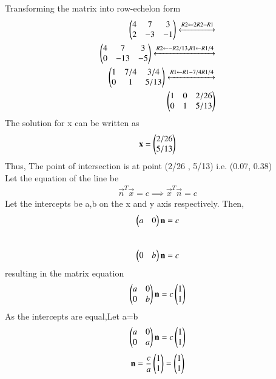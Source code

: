 \documentclass[journal,12pt,twocolumn]{IEEEtran}
\begin{document}
\begin{flushleft}
    Transforming the matrix into row-echelon form \\
    \begin{align}
    \begin{pmatrix}
    4 & 7 & 3 \\
    2 & -3 & -1
    \end{pmatrix}
      \xleftrightarrow[]{R2 \leftarrow 2R2 - R1 } \nonumber \\
    \begin{pmatrix}
    4 & 7 & 3 \\
    0 & -13 & -5
    \end{pmatrix}
    \xleftrightarrow[]{R2 \leftarrow -R2/13,R1 \leftarrow R1/4} \nonumber \\
    \begin{pmatrix}
    1 & 7/4 & 3/4 \\
    0 & 1 & 5/13
    \end{pmatrix}
    \xleftrightarrow[]{R1 \leftarrow R1-7/4R1/4} \nonumber \\
    \begin{pmatrix}
    1 & 0 & 2/26 \\
    0 & 1 & 5/13
    \end{pmatrix}
    \end{align}
    The solution for x can be written as 
    \begin{align}
    \label{expk}
    \mathbf{x} = \begin{pmatrix}2/26 \\ 5/13\end{pmatrix}
    \end{align}
    Thus, The point of intersection is at point (2/26 , 5/13) i.e. (0.07, 0.38)\\
    Let the equation of the line be
    \begin{align}
    \label{equ}
    \vec{n}^T\vec{x} = c \implies \vec{x}^T\vec{n} = c
    \end{align}
    Let the intercepts be a,b on the x and y axis respectively. Then,
    \begin{align} 
    \begin{pmatrix}a & 0\end{pmatrix}\mathbf{n} = c
    \end{align}
    \\
    \begin{align} 
    \begin{pmatrix}0 & b\end{pmatrix}\mathbf{n} = c
    \end{align}
    resulting in the matrix equation
    \begin{align}
    \begin{pmatrix}a & 0 \\ 0 & b\end{pmatrix}\mathbf{n} = c \begin{pmatrix}1 \\ 1\end{pmatrix}
    \end{align}
    As the intercepts are equal,Let a=b
    \begin{align}
    \begin{pmatrix}a & 0 \\ 0 & a\end{pmatrix}\mathbf{n} = c \begin{pmatrix}1 \\ 1\end{pmatrix}
    \end{align}
    \begin{align}
    \vec{n} = \frac{c}{a}\myvec{1\\1} = \myvec{1\\1}

\end{align}
\end{flushleft}
\end{document}
